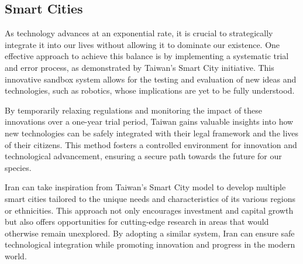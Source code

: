 \documentclass{IEEEtran}
\begin{document}
\subsection{Smart Cities}

As technology advances at an exponential rate, it is crucial to strategically integrate it into our lives without allowing it to dominate our existence. One effective approach to achieve this balance is by implementing a systematic trial and error process, as demonstrated by Taiwan's Smart City initiative. This innovative sandbox system allows for the testing and evaluation of new ideas and technologies, such as robotics, whose implications are yet to be fully understood.

By temporarily relaxing regulations and monitoring the impact of these innovations over a one-year trial period, Taiwan gains valuable insights into how new technologies can be safely integrated with their legal framework and the lives of their citizens. This method fosters a controlled environment for innovation and technological advancement, ensuring a secure path towards the future for our species.

Iran can take inspiration from Taiwan's Smart City model to develop multiple smart cities tailored to the unique needs and characteristics of its various regions or ethnicities. This approach not only encourages investment and capital growth but also offers opportunities for cutting-edge research in areas that would otherwise remain unexplored. By adopting a similar system, Iran can ensure safe technological integration while promoting innovation and progress in the modern world.




\end{document}
